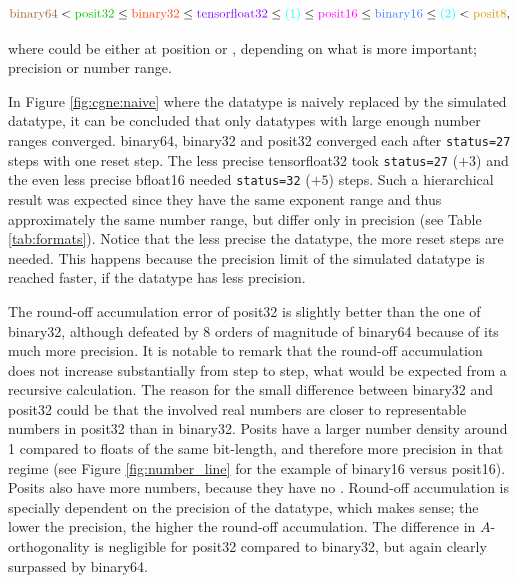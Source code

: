 \documentclass{article}
\theoremstyle{plain} %
\theoremstyle{convention} %
\theoremstyle{remark} %
\def\code#1{\texttt{#1}}
\numberwithin{equation}{section}
\begin{document}
\begin{align}
    \textcolor{cbrown}{\text{binary64}} < \textcolor{cgreen}{\text{posit32}} \leq \textcolor{cred}{\text{binary32}} \leq \textcolor{cpurple}{\text{tensorfloat32}} \leq \textcolor{cturquois}{\text{(1)}} \leq \textcolor{cpink}{\text{posit16}} \leq \textcolor{cblue}{\text{binary16}} \leq \textcolor{cturquois}{\text{(2)}} < \textcolor{cyellow}{\text{posit8}}, \label{eq:hierarchy}
\end{align}

where \textcolor{cturquois}{} could be either at position \textcolor{cturquois}{} or \textcolor{cturquois}{}, depending on what is more important; precision or number range.

In Figure \ref{fig:cgne:naive} where the datatype is naively replaced by the simulated datatype, it can be concluded that only datatypes with large enough number ranges converged. \gls{binary64}, \gls{binary32} and \gls{posit32} converged each after \code{status=27} steps with one reset step. The less precise \gls{tensorfloat32} took \code{status=27} ($+3$) and the even less precise \gls{bfloat16} needed \code{status=32} ($+5$) steps. Such a hierarchical result was expected since they have the same exponent range and thus approximately the same number range, but differ only in precision (see Table \ref{tab:formats}). Notice that the less precise the datatype, the more reset steps are needed. This happens because the precision limit of the simulated datatype is reached faster, if the datatype has less precision.

The round-off accumulation error of \gls{posit32} is slightly better than the one of \gls{binary32}, although defeated by $8$ orders of magnitude of \gls{binary64} because of its much more precision. It is notable to remark that the round-off accumulation does not increase substantially from step to step, what would be expected from a recursive calculation. The reason for the small difference between \gls{binary32} and \gls{posit32} could be that the involved real numbers are closer to representable numbers in \gls{posit32} than in \gls{binary32}. Posits have a larger number density around \num{1} compared to floats of the same bit-length, and therefore more precision in that regime (see Figure \ref{fig:number_line} for the example of \gls{binary16} versus \gls{posit16}). Posits also have more numbers, because they have no . Round-off accumulation is specially dependent on the precision of the datatype, which makes sense; the lower the precision, the higher the round-off accumulation. The difference in $A$-orthogonality is negligible for \gls{posit32} compared to \gls{binary32}, but again clearly surpassed by \gls{binary64}.
\end{document}
